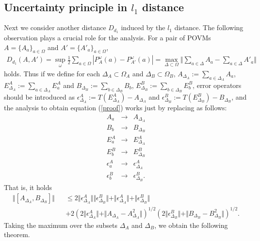 \documentclass[showpacs,preprintnumbers,amsmath,amssymb]{revtex4}
\begin{document}
\subsection{Uncertainty principle in $l_1$ distance}
Next we consider another distance $D_{d_1}$ induced by 
the $l_1$ distance. 
The following observation \cite{Werner} plays a crucial role 
for the analysis. For a pair of POVMs $A=\{A_a\}_{a\in \Omega}$
and $A'=\{A'_a\}_{a\in \Omega}$,  
\begin{eqnarray*}
D_{d_1}(A,A')=\sup_{\omega}\frac{1}{2}
\sum_{a\in \Omega}
|P^\omega_A(a)-P^\omega_{A'}(a)|
=\max_{\Delta \subset \Omega}
\Vert \sum_{a\in \Delta}A_a
-\sum_{a\in \Delta}A'_a\Vert
\end{eqnarray*}
holds. Thus if we define for each $\Delta_A \subset \Omega_A$ 
and $\Delta_B \subset \Omega_B$, 
$A_{\Delta_A}:=\sum_{a\in \Delta_A}A_a$, 
$E^A_{\Delta_A}:=\sum_{a\in \Delta_A}E^A_a$
 and 
$B_{\Delta_B}:=\sum_{b\in \Delta_B}B_b$, 
$E^B_{\Delta_B}:=\sum_{b\in \Delta_B}E^B_b$, 
error operators should be introduced as
$\epsilon^A_{\Delta_A}:=T(E^A_{\Delta_A})-A_{\Delta_A}$
and $\epsilon^B_{\Delta_B}:=T(E^B_{\Delta_B})-
B_{\Delta_B}$, and the analysis to obtain 
equation (\ref{proof})
works 
just by replacing as follows:
\begin{eqnarray*}
A_a &\to& A_{\Delta_A} \\
B_b &\to& B_{\Delta_B} \\
E^A_a &\to& E^A_{\Delta_A}\\
E^B_b &\to& E^B_{\Delta_B} \\
\epsilon^A_a &\to& \epsilon^A_{\Delta_A}\\
\epsilon^B_b &\to& \epsilon^B_{\Delta_B}.
\end{eqnarray*}
That is, it holds
\begin{eqnarray*}
\Vert [A_{\Delta_A},B_{\Delta_B}]
\Vert &&
\leq 2\Vert \epsilon^A_{\Delta_A}
 \Vert \Vert \epsilon^B_{\Delta_B} \Vert 
+\Vert \epsilon^A_{\Delta_A} \Vert +\Vert \epsilon^B_{\Delta_B}
 \Vert 
\\
&&
+2(2\Vert \epsilon^A_{\Delta_A}
\Vert +\Vert A_{\Delta_A}-A_{\Delta_A}^2\Vert
)^{1/2}
(2\Vert \epsilon^B_{\Delta_B}\Vert +\Vert B_{\Delta_B}
-B_{\Delta_B}^2\Vert
)^{1/2}.
\end{eqnarray*}
Taking the maximum over the subsets $\Delta_A$ and $\Delta_B$, 
we obtain the following theorem.
\end{document}
